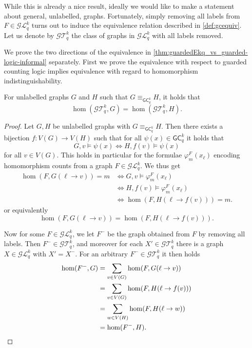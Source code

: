 \documentclass{lmcs}
\theoremstyle{plain}\newtheorem{claim}[thm]{Claim}   %
\newcommand{\cG}{\ensuremath{\mathcal G}}
\newcommand{\cL}{\ensuremath{\mathcal L}}
\newcommand{\cT}{\ensuremath{\mathcal T}}
\newcommand	{\homInd}			{homomorphism indistinguishability}
\newcommand{\Ekq}{\ensuremath{\cT_{q}^{k}}}
\newcommand{\Lkq}{\ensuremath{\cL_{q}^{k}}}
\newcommand{\GEkq}{\ensuremath{\cG\Lkq}}
\newcommand{\GEkqLL}{\ensuremath{\cG\Ekq}}
\newcommand{\lGC}{\ensuremath{\mathsf{GC}}}
\renewcommand\phi\varphi
\begin{document}
While this is already a nice result, ideally we would like to make a statement about general, unlabelled, graphs.
Fortunately, simply removing all labels from $F \in \GEkq$ turns out to induce the equivalence relation described in \autoref{def:gcequiv}.
Let us denote by $\GEkqLL$ the class of graphs in $\GEkq$ with all labels removed.

We prove the two directions of the equivalence in \autoref{thm:guardedEkq_vs_guarded-logic-informal} separately.
First we prove the equivalence with respect to guarded counting logic implies equivalence with regard to \homInd.

\begin{lem}\label{lem:labelsFw}
	For unlabelled graphs $G$ and $H$ such that $G \equiv_{\lGC^k_q} H$,
	it holds that
	\[\hom(\GEkqLL, G) = \hom(\GEkqLL, H).\]
\end{lem}

\begin{proof}
	Let $G, H$ be unlabelled graphs with $G \equiv_{\lGC^k_q} H$.
	Then there exists a bijection $f \colon V(G) \to V(H)$ such that for all $\psi(x) \in \lGC^k_q$ it holds that
	\begin{equation*}
		G, v \models \psi(x) \iff H, f(v) \models \psi(x)
	\end{equation*}
	for all $v \in V(G)$.
	This holds in particular for the formulae $\phi^F_m(x_\ell)$ encoding homomorphism counts from a graph $F \in \GEkq$.
	We thus get
	\begin{align*}
		\hom(F, G(\ell \to v)) = m &\iff G, v \models \phi^F_m(x_\ell)\\
		&\iff H, f(v) \models \phi^F_m(x_\ell)\\
		&\iff \hom(F, H(\ell \to f(v))) = m.
	\end{align*}
	or equivalently
	\begin{equation*}
		\hom(F, G(\ell \to v)) = \hom(F, H(\ell \to f(v))).
	\end{equation*}
	
	Now for some $F \in \GEkq$, we let $F^-$ be the graph obtained from $F$ by removing all labels.
	Then $F^- \in \GEkqLL$, and moreover for each $X' \in \GEkqLL$ there is a graph $X \in \GEkq$ with $X' = X^-$.
	For an arbitrary $F^- \in \GEkqLL$ it then holds
	\begin{align*}
		\hom(F^-, G) &= \sum_{v \in V(G)}\hom(F, G(\ell \to v))\\
		&= \sum_{v \in V(G)} \hom(F, H(\ell \to f(v)))\\
		&= \sum_{w \in V(H)} \hom(F, H(\ell \to w))\\
		&= \hom(F^-, H).
		\qedhere
	\end{align*}
\end{proof}
\end{document}
